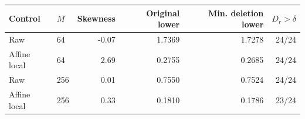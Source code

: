\begin{tabular}{llrrrr}
\toprule
Control & $M$ & Skewness & Original lower & Min. deletion lower & $D_r>\delta$ \\
\midrule
Raw & 64 & -0.07 & 1.7369 & 1.7278 & 24/24 \\
Affine local & 64 & 2.69 & 0.2755 & 0.2685 & 24/24 \\
Raw & 256 & 0.01 & 0.7550 & 0.7524 & 24/24 \\
Affine local & 256 & 0.33 & 0.1810 & 0.1786 & 23/24 \\
\bottomrule
\end{tabular}
